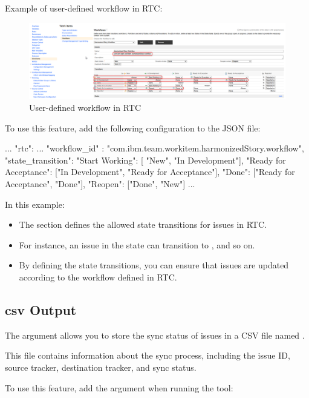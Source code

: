 Example of user-defined workflow in RTC:

\begin{figure}[h!]
   \includegraphics[width=1\linewidth]{./pictures/user-defined-workflow.png}
   \caption{User-defined workflow in RTC}
\end{figure}

To use this feature, add the following configuration to the JSON file:

\begin{pythoncode}
{
   ...
   "rtc": {
      ...
      "workflow_id" : "com.ibm.team.workitem.harmonizedStory.workflow",
      "state_transition": {
         "Start Working": [ "New", "In Development"],
         "Ready for Acceptance": ["In Development", "Ready for Acceptance"],
         "Done": ["Ready for Acceptance", "Done"],
         "Reopen": ["Done", "New"]
      }
   }
   ...
}
\end{pythoncode}

In this example:
\begin{itemize}
   \item The  section defines the allowed state
         transitions for issues in RTC.
   \item For instance, an issue in the  state can transition to
         , and so on.
   \item By defining the state transitions, you can ensure that issues are
         updated according to the workflow defined in RTC.
\end{itemize}

\subsection{csv Output}
The  argument allows you to store the sync status of issues in a
CSV file named .

This file contains information about the sync process, including the issue ID,
source tracker, destination tracker, and sync status.

To use this feature, add the  argument when running the tool:

